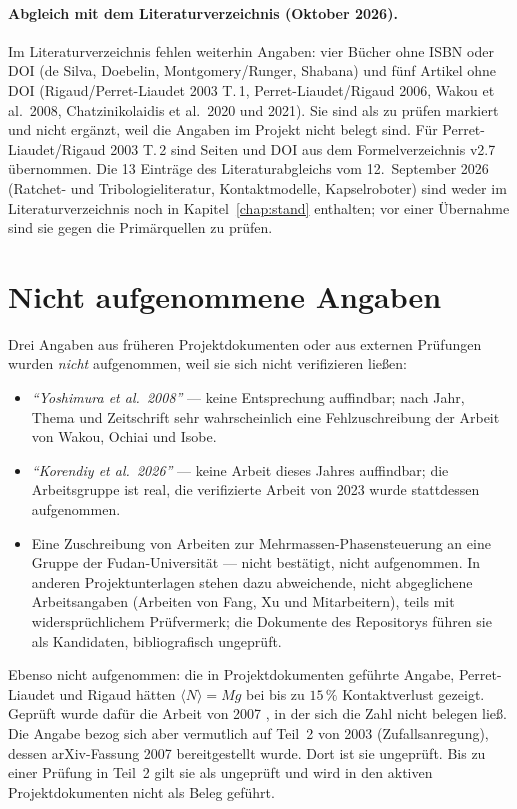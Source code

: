 \documentclass[12pt,a4paper]{report}
\begin{document}
\paragraph{Abgleich mit dem Literaturverzeichnis (Oktober 2026).}
Im Literaturverzeichnis fehlen weiterhin Angaben: vier Bücher ohne ISBN
oder DOI (de Silva, Doebelin, Montgomery/Runger, Shabana) und fünf
Artikel ohne DOI (Rigaud/Perret-Liaudet 2003 T.\,1, Perret-Liaudet/Rigaud
2006, Wakou et al.\ 2008, Chatzinikolaidis et al.\ 2020 und 2021). Sie
sind als zu prüfen markiert und nicht ergänzt, weil die Angaben im
Projekt nicht belegt sind. Für Perret-Liaudet/Rigaud 2003 T.\,2 sind
Seiten und DOI aus dem Formelverzeichnis v2.7 übernommen. Die
13 Einträge des Literaturabgleichs vom 12.~September 2026 (Ratchet- und
Tribologieliteratur, Kontaktmodelle, Kapselroboter) sind weder im
Literaturverzeichnis noch in Kapitel~\ref{chap:stand} enthalten; vor einer
Übernahme sind sie gegen die Primärquellen zu prüfen.

\section{Nicht aufgenommene Angaben}

Drei Angaben aus früheren Projektdokumenten oder aus externen
Prüfungen wurden \emph{nicht} aufgenommen, weil sie sich nicht
verifizieren ließen:

\begin{itemize}
\item \emph{``Yoshimura et al.\ 2008''} --- keine Entsprechung
      auffindbar; nach Jahr, Thema und Zeitschrift sehr wahrscheinlich
      eine Fehlzuschreibung der Arbeit von Wakou, Ochiai und Isobe.
\item \emph{``Korendiy et al.\ 2026''} --- keine Arbeit dieses Jahres
      auffindbar; die Arbeitsgruppe ist real, die verifizierte Arbeit
      von 2023 wurde stattdessen aufgenommen.
\item Eine Zuschreibung von Arbeiten zur Mehrmassen-Phasensteuerung an
      eine Gruppe der Fudan-Universität --- nicht bestätigt, nicht
      aufgenommen. In anderen Projektunterlagen stehen dazu abweichende,
      nicht abgeglichene Arbeitsangaben (Arbeiten von Fang, Xu und
      Mitarbeitern), teils mit widersprüchlichem Prüfvermerk; die
      Dokumente des Repositorys führen sie als Kandidaten, bibliografisch
      ungeprüft.
\end{itemize}

Ebenso nicht aufgenommen: die in Projektdokumenten geführte Angabe,
Perret-Liaudet und Rigaud hätten $\langle N \rangle = Mg$ bei bis zu
$15\,\%$ Kontaktverlust gezeigt. Geprüft wurde dafür die Arbeit von 2007
\cite{perretliaudet2007}, in der sich die Zahl nicht belegen ließ. Die
Angabe bezog sich aber vermutlich auf Teil~2 von 2003
\cite{perretliaudet2003} (Zufallsanregung), dessen arXiv-Fassung 2007
bereitgestellt wurde. Dort ist sie ungeprüft. Bis zu einer Prüfung in
Teil~2 gilt sie als ungeprüft und wird in den aktiven Projektdokumenten
nicht als Beleg geführt.
\end{document}
